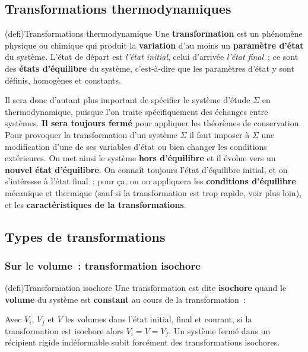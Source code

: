 \documentclass[../../main/main.tex]{subfiles}
\begin{document}
\subsection{Transformations thermodynamiques}
\begin{tcb*}(defi){Transformations thermodynamique}
	Une \textbf{transformation} est un phénomène physique ou chimique qui produit
	la \textbf{variation} d'au moins un \textbf{paramètre d'état} du système.
	L'état de départ est \textit{l'état initial}, celui d'arrivée \textit{l'état
		final}~; ce sont des \textbf{états d'équilibre} du système, c'est-à-dire que
	les paramètres d'état y sont définis, homogènes et constants.
\end{tcb*}

Il sera donc d'autant plus important de spécifier le système d'étude $\Sigma$ en
thermodynamique, puisque l'on traite spécifiquement des échanges entre systèmes.
\textbf{Il sera toujours fermé} pour appliquer les théorèmes de conservation.
\bigbreak
Pour provoquer la transformation d'un système $\Sigma$ il faut imposer à
$\Sigma$ une modification d'une de ses variables d'état ou bien changer les
conditions extérieures. On met ainsi le système \textbf{hors d'équilibre} et il
évolue vers un \textbf{nouvel état d'équilibre}. On connaît toujours l'état
d'équilibre initial, et on s'intéresse à l'état final~; pour ça, on on
appliquera les \textbf{conditions d'équilibre} mécanique et thermique (sauf si
la transformation est trop rapide, voir plus loin), et les
\textbf{caractéristiques de la transformations}.

\subsection{Types de transformations}
\subsubsection{Sur le volume~: transformation isochore}

\begin{tcb*}(defi){Transformation isochore}
	Une transformation est dite \textbf{isochore} quand le \textbf{volume} du
	système est \textbf{constant} au cours de la transformation~:
	\psw{%
		\[
			\boxed{V = \cte \Lra \dd{V} = 0}
		\]
	}%
	\vspace{-15pt}
\end{tcb*}
Avec $V_i$, $V_f$ et $V$ les volumes dans l'état initial, final et courant, si
la transformation est isochore alors $V_i = V = V_f$. Un système fermé dans un
récipient rigide indéformable subit forcément des transformations isochores.
\end{document}
